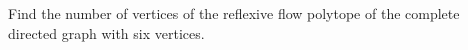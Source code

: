 Find the number of vertices of the reflexive flow polytope of the complete directed graph with six vertices.
